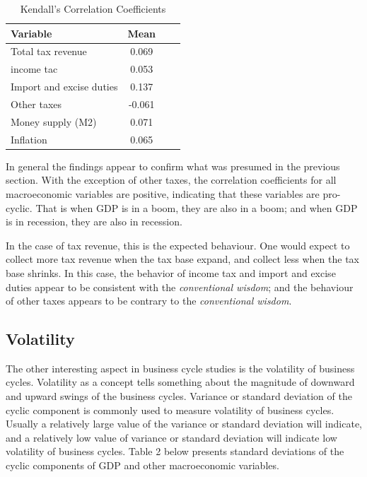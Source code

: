 \documentclass[12pt,a4paper,final]{article}
\begin{document}
\begin{table}[h]
\centering
\begin{small} 
\caption{Kendall's Correlation Coefficients} 
\label{sumstat}
\begin{tabular}{l c c  c}
\toprule
\multicolumn{1}{l}{\textbf{Variable}} & \textbf{Mean}\\ 
 \midrule
Total tax revenue & 0.069 \\
income tac & 0.053 \\
Import and excise duties & 0.137\\
Other taxes  & -0.061\\
Money supply (M2) & 0.071 \\
Inflation & 0.065\\
\bottomrule
\end{tabular}
\end{small}
\end{table}

In general the findings appear to confirm what was presumed in the previous section. With the exception of other taxes, the correlation coefficients for all macroeconomic variables are positive, indicating that these variables are pro-cyclic. That is when GDP is in a boom, they are also in a boom; and when GDP is in recession, they are also in recession. 

In the case of tax revenue, this is the expected behaviour. One would expect to collect more tax revenue when the tax base expand, and collect less when the tax base shrinks. In this case, the behavior of income tax and import and excise duties appear to be consistent with the \textit{conventional wisdom}; and the behaviour of other taxes appears to be contrary to the \textit{conventional wisdom}.

\subsection{Volatility}

The other interesting aspect in business cycle studies is the volatility of business cycles. Volatility as a concept tells something about the magnitude of downward and upward swings of the business cycles. Variance or standard deviation of the cyclic component is commonly used to measure volatility of business cycles. Usually a relatively large value of the variance or standard deviation will indicate, and a relatively low value of variance or standard deviation will indicate low volatility of business cycles. Table 2 below presents standard deviations of the cyclic components of GDP and other macroeconomic variables.
\end{document}
